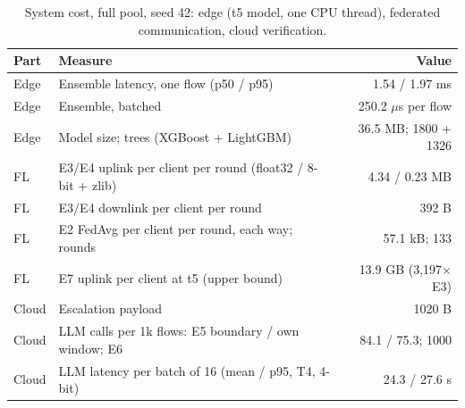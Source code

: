 \begin{table}[t]
\centering
\caption{System cost, full pool, seed 42: edge (t5 model, one CPU thread), federated communication, cloud verification.}
\label{tab:efficiency}
\begin{tabular}{llr}
\toprule
Part & Measure & Value \\
\midrule
Edge & Ensemble latency, one flow (p50 / p95) & 1.54 / 1.97 ms \\
Edge & Ensemble, batched & 250.2 $\mu$s per flow \\
Edge & Model size; trees (XGBoost + LightGBM) & 36.5 MB; 1800 + 1326 \\
FL & E3/E4 uplink per client per round (float32 / 8-bit + zlib) & 4.34 / 0.23 MB \\
FL & E3/E4 downlink per client per round & 392 B \\
FL & E2 FedAvg per client per round, each way; rounds & 57.1 kB; 133 \\
FL & E7 uplink per client at t5 (upper bound) & 13.9 GB (3,197$\times$ E3) \\
Cloud & Escalation payload & 1020 B \\
Cloud & LLM calls per 1k flows: E5 boundary / own window; E6 & 84.1 / 75.3; 1000 \\
Cloud & LLM latency per batch of 16 (mean / p95, T4, 4-bit) & 24.3 / 27.6 s \\
\bottomrule
\end{tabular}
\end{table}
